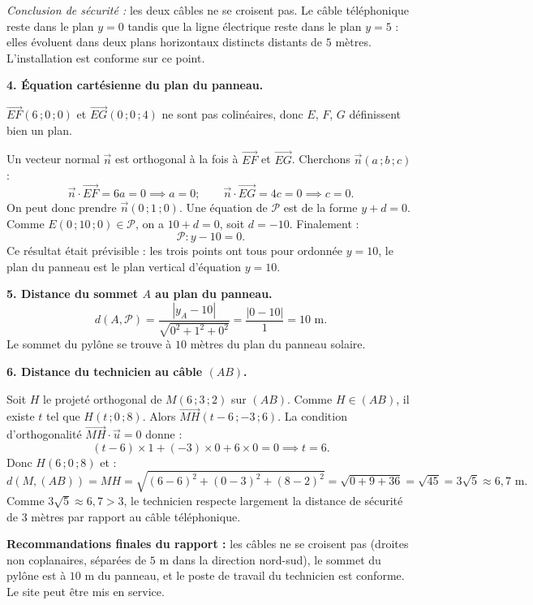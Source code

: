\documentclass[11pt]{article}
\begin{document}
\begin{exoresolu}
\emph{Conclusion de sécurité :} les deux câbles ne se croisent pas. Le câble téléphonique reste dans le plan $y = 0$ tandis que la ligne électrique reste dans le plan $y = 5$ : elles évoluent dans deux plans horizontaux distincts distants de $5$ mètres. L'installation est conforme sur ce point.

\textbf{4. Équation cartésienne du plan du panneau.}

$\overrightarrow{EF}(6\,;0\,;0)$ et $\overrightarrow{EG}(0\,;0\,;4)$ ne sont pas colinéaires, donc $E$, $F$, $G$ définissent bien un plan.

Un vecteur normal $\vec{n}$ est orthogonal à la fois à $\overrightarrow{EF}$ et $\overrightarrow{EG}$. Cherchons $\vec{n}(a\,;b\,;c)$ :
\[
\vec{n} \cdot \overrightarrow{EF} = 6a = 0 \implies a = 0 ; \qquad \vec{n} \cdot \overrightarrow{EG} = 4c = 0 \implies c = 0.
\]
On peut donc prendre $\vec{n}(0\,;1\,;0)$. Une équation de $\mathcal{P}$ est de la forme $y + d = 0$. Comme $E(0\,;10\,;0) \in \mathcal{P}$, on a $10 + d = 0$, soit $d = -10$. Finalement :
\[
\mathcal{P} : y - 10 = 0.
\]
Ce résultat était prévisible : les trois points ont tous pour ordonnée $y = 10$, le plan du panneau est le plan vertical d'équation $y = 10$.

\textbf{5. Distance du sommet $A$ au plan du panneau.}
\[
d(A,\mathcal{P}) = \frac{|y_A - 10|}{\sqrt{0^2 + 1^2 + 0^2}} = \frac{|0 - 10|}{1} = 10 \text{ m}.
\]
Le sommet du pylône se trouve à $10$ mètres du plan du panneau solaire.

\textbf{6. Distance du technicien au câble $(AB)$.}

Soit $H$ le projeté orthogonal de $M(6\,;3\,;2)$ sur $(AB)$. Comme $H \in (AB)$, il existe $t$ tel que $H(t\,;0\,;8)$. Alors $\overrightarrow{MH}(t-6\,;-3\,;6)$. La condition d'orthogonalité $\overrightarrow{MH} \cdot \vec{u} = 0$ donne :
\[
(t-6) \times 1 + (-3) \times 0 + 6 \times 0 = 0 \implies t = 6.
\]
Donc $H(6\,;0\,;8)$ et :
\[
d(M,(AB)) = MH = \sqrt{(6-6)^2 + (0-3)^2 + (8-2)^2} = \sqrt{0 + 9 + 36} = \sqrt{45} = 3\sqrt{5} \approx 6{,}7 \text{ m}.
\]
Comme $3\sqrt{5} \approx 6{,}7 > 3$, le technicien respecte largement la distance de sécurité de $3$ mètres par rapport au câble téléphonique.

\textbf{Recommandations finales du rapport :} les câbles ne se croisent pas (droites non coplanaires, séparées de $5$ m dans la direction nord-sud), le sommet du pylône est à $10$ m du panneau, et le poste de travail du technicien est conforme. Le site peut être mis en service.
\end{exoresolu}
\end{document}
